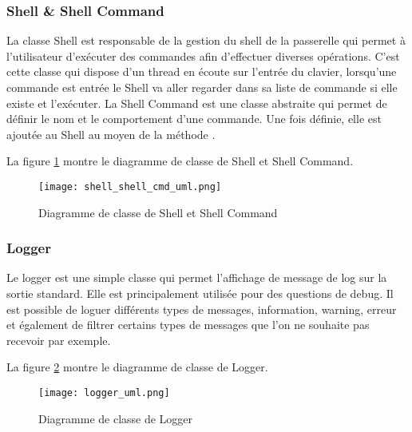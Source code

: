 \subsubsection{Shell \& Shell Command}

La classe Shell est responsable de la gestion du shell de la passerelle qui permet à l'utilisateur d'exécuter des commandes afin d'effectuer diverses opérations. C'est cette classe qui dispose d'un thread en écoute sur l'entrée du clavier, lorsqu'une commande est entrée le Shell va aller regarder dans sa liste de commande si elle existe et l'exécuter.
La Shell Command est une classe abstraite qui permet de définir le nom et le comportement d'une commande. Une fois définie, elle est ajoutée au Shell au moyen de la méthode .

La figure \ref{fig:shell_shell_cmd_uml} montre le diagramme de classe de Shell et Shell Command.

\begin{figure}[htb]
\centering 
\texttt{[image: shell\_shell\_cmd\_uml.png]} 
\caption{Diagramme de classe de Shell et Shell Command}
\label{fig:shell_shell_cmd_uml}
 \end{figure}

\subsubsection{Logger}

Le logger est une simple classe qui permet l'affichage de message de log sur la sortie standard. Elle est principalement utilisée pour des questions de debug. Il est possible de loguer différents types de messages, information, warning, erreur et également de filtrer certains types de messages que l'on ne souhaite pas recevoir par exemple.

La figure \ref{fig:logger_uml} montre le diagramme de classe de Logger.

\begin{figure}[htb]
\centering 
\texttt{[image: logger\_uml.png]} 
\caption{Diagramme de classe de Logger}
\label{fig:logger_uml}
 \end{figure}
